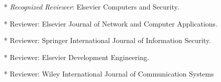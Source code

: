 \begin{itemize}
\begin{itemize}
	\item[*] \textit{Recognized Reviewer}: Elsevier Computers and Security.

	\item[*] Reviewer: Elsevier Journal of Network and Computer Applications.
	
	\item[*] Reviewer: Springer International Journal of Information Security.
	
	\item[*] Reviewer: Elsevier Development Engineering. 
	
	\item[*] Reviewer: Wiley International Journal of Communication Systems

	
	\end{itemize}
	
	
		\end{itemize}